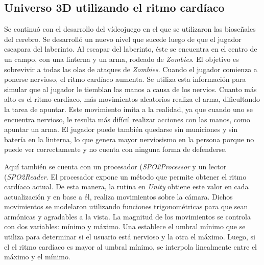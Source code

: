 \subsection{Universo 3D utilizando el ritmo cardíaco}

Se continuó con el desarrollo del vídeojuego en el que se utilizaron las bioseñales del cerebro. Se desarrolló un nuevo nivel que sucede luego de que el jugador escapara del laberinto. Al escapar del laberinto, éste se encuentra en el centro de un campo,  con una linterna y un arma, rodeado de \emph{Zombies}. El objetivo es sobrevivir a todas las olas de ataques de \emph{Zombies}. Cuando el jugador comienza a ponerse nervioso, el ritmo cardíaco aumenta. Se utiliza esta información para simular que al jugador le tiemblan las manos a causa de los nervios. Cuanto más alto es el ritmo cardíaco, más movimientos aleatorios realiza el arma, dificultando la tarea de apuntar. Este movimiento imita a la realidad, ya que cuando uno se encuentra nervioso, le resulta más difícil realizar acciones con las manos, como apuntar un arma. El jugador puede también quedarse sin municiones y sin batería en la linterna, lo que genera mayor nerviosismo en la persona porque no puede ver correctamente y no cuenta con ninguna forma de defenderse.

Aquí también se cuenta con un procesador (\emph{SPO2Processor} y un lector (\emph{SPO2Reader}. El procesador expone un método que permite obtener el ritmo cardíaco actual. De esta manera, la rutina en \emph{Unity} obtiene este valor en cada actualización y en base a él, realiza movimientos sobre la cámara. Dichos movimientos se modelaron utilizando funciones trigonométricas para que sean armónicas y agradables a la vista. La magnitud de los movimientos se controla con dos variables: mínimo y máximo. Una establece el umbral mínimo que se utiliza para determinar si el usuario está nervioso y la otra el máximo. Luego, si el el ritmo cardíaco es mayor al umbral mínimo, se interpola linealmente entre el máximo y el mínimo.